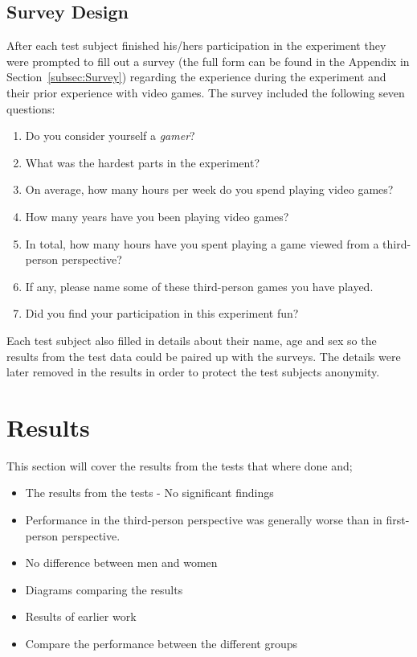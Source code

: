\documentclass[runningheads,a4paper,oribibl]{llncs}
\begin{document}
\subsection{Survey Design}
After each test subject finished his/hers participation in the experiment they were prompted to fill out a survey (the full form can be found in the Appendix in Section~\ref{subsec:Survey})  regarding the experience during the experiment and their prior experience with video games. The survey included the following seven questions:
\begin{enumerate}
	\item Do you consider yourself a \emph{gamer}?
	\item What was the hardest parts in the experiment?
	\item On average, how many hours per week do you spend playing video games?
	\item How many years have you been playing video games?
	\item In total, how many hours have you spent playing a game viewed from a third-person perspective?
	\item If any, please name some of these third-person games you have played.
	\item Did you find your participation in this experiment fun?
\end{enumerate}
Each test subject also filled in details about their name, age and sex so the results from the test data could be paired up with the surveys. The details were later removed in the results in order to protect the test subjects anonymity.











\section{Results}
This section will cover the results from the tests that where done and;
\begin{itemize}
	\item The results from the tests - No significant findings
	\item Performance in the third-person perspective was generally worse than in first-person perspective.
	\item No difference between men and women
	\item Diagrams comparing the results
	\item Results of earlier work
	\item Compare the performance between the different groups
\end{itemize}
\end{document}
